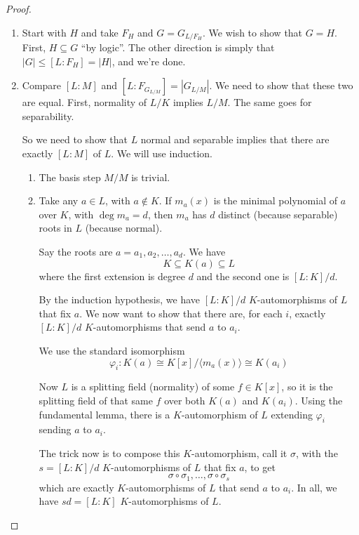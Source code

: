 \documentclass{article}
\newcommand{\bkt}[1]{\langle #1 \rangle}
\theoremstyle{definition}
\begin{document}
\begin{proof}
  \begin{enumerate}
  \item Start with $H$ and take $F_H$ and $G = G_{L/F_H}$. We wish to show that $G=H$.
First, $H\subseteq G$ ``by logic''. The other direction is simply that $|G| \leq
[L:F_H] = |H|$, and we're done.
\item Compare $[L:M]$ and $[L:F_{G_{L/M}}] = |G_{L/M}|$. We need to show that
  these two are equal. First, normality of $L/K$ implies $L/M$. The same goes
  for separability. 

  So we need to show that $L$ normal and separable implies that there are
  exactly $[L:M]$ of $L$. We will use induction.
  \begin{enumerate}
  \item The basis step $M/M$ is trivial. 
  \item Take any $a\in L$, with $a\not\in K$. If $m_a(x)$ is the minimal
    polynomial of $a$ over $K$, with $\deg m_a=d$, then $m_a$ has $d$ distinct
    (because separable) roots in $L$ (because normal).

    Say the roots are $a = a_1, a_2, \ldots, a_d$. We have
    $$K\subseteq K(a) \subseteq L$$
    where the first extension is degree $d$ and the second one is $[L:K]/d$.

    By the induction hypothesis, we have $[L:K]/d$ $K$-automorphisms of $L$ that
    fix $a$. We now want to show that there are, for each $i$, exactly $[L:K]/d$
    $K$-automorphisms that send $a$ to $a_i$.

    We use the standard isomorphism
    $$\varphi_i: K(a) \cong K[x]/\bkt{m_a(x)} \cong K(a_i)$$

    Now $L$ is a splitting field (normality) of some $f\in K[x]$, so it is the splitting
    field of that same $f$ over both $K(a)$ and $K(a_i)$. Using the fundamental
    lemma, there is a $K$-automorphism of $L$ extending $\varphi_i$ sending $a$
    to $a_i$.

    The trick now is to compose this $K$-automorphism, call it $\sigma$, with
    the $s = [L:K]/d$ $K$-automorphisms of $L$ that fix $a$, to get
    $$\sigma\circ\sigma_1,\ldots,\sigma\circ\sigma_s$$
    which are exactly $K$-automorphisms of $L$ that send $a$ to $a_i$. In all,
    we have $sd = [L:K]$ $K$-automorphisms of $L$.
  \end{enumerate}
\end{enumerate}
\end{proof}
\end{document}

